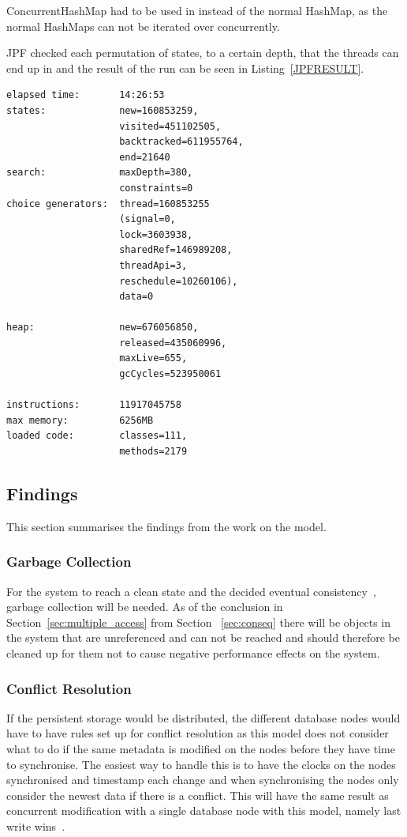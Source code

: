 \documentclass[a4paper,12pt]{article}
\begin{document}
ConcurrentHashMap had to be used in instead of the normal HashMap, as the normal HashMaps can not 
be iterated over concurrently.

JPF checked each permutation of states, to a certain depth, that the threads can end up in and the 
result of the run can be seen in Listing~\ref{JPFRESULT}.

\begin{minipage}{\linewidth}
\begin{lstlisting}[label=JPFRESULT,caption=Results of JPF run]%,float,floatplacement=H]
elapsed time:       14:26:53
states:             new=160853259,
                    visited=451102505,
                    backtracked=611955764,
                    end=21640
search:             maxDepth=380,
                    constraints=0
choice generators:  thread=160853255 
                    (signal=0,
                    lock=3603938,
                    sharedRef=146989208,
                    threadApi=3,
                    reschedule=10260106), 
                    data=0

heap:               new=676056850,
                    released=435060996,
                    maxLive=655,
                    gcCycles=523950061

instructions:       11917045758
max memory:         6256MB
loaded code:        classes=111,
                    methods=2179
\end{lstlisting}
\end{minipage}

\subsection{Findings}
This section summarises the findings from the work on the model. 

\subsubsection{Garbage Collection}
For the system to reach a clean state and the decided eventual consistency~\cite{KLINGSBO}, garbage
collection will be needed. As of the conclusion in Section~\ref{sec:multiple_access} from Section
~\ref{sec:conseq} there will be objects in the system that are unreferenced and can not be reached
and should therefore be cleaned up for them not to cause negative performance effects on the system.

\subsubsection{Conflict Resolution} \label{sec:conflict_res}
If the persistent storage would be distributed, the different database nodes would have to have rules
set up for conflict resolution as this model does not consider what to do if the same metadata is
modified on the nodes before they have time to synchronise. The easiest way to handle this is to
have the clocks on the nodes synchronised and timestamp each change and when synchronising the nodes
only consider the newest data if there is a conflict. This will have the same result as concurrent
modification with a single database node with this model, namely last write
wins~\cite{LASTWRITEWINS}.
\end{document}
